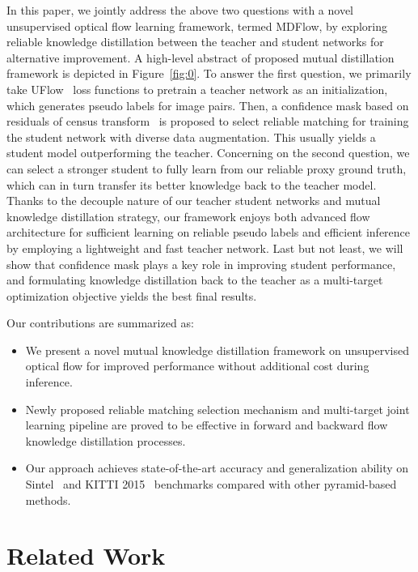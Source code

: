 \documentclass[lettersize,journal]{IEEEtran}
\begin{document}
In this paper, we jointly address the above two questions with a novel unsupervised optical flow learning framework, termed MDFlow, by exploring reliable knowledge distillation between the teacher and student networks for alternative improvement. A high-level abstract of proposed mutual distillation framework is depicted in Figure~\ref{fig:0}. To answer the first question, we primarily take UFlow~\cite{10.1007/978-3-030-58536-5_33} loss functions to pretrain a teacher network as an initialization, which generates pseudo labels for image pairs. Then, a confidence mask based on residuals of census transform~\cite{10.1007/BFb0028345} is proposed to select reliable matching for training the student network with diverse data augmentation. This usually yields a student model outperforming the teacher. Concerning on the second question, we can select a stronger student to fully learn from our reliable proxy ground truth, which can in turn transfer its better knowledge back to the teacher model. Thanks to the decouple nature of our teacher student networks and mutual knowledge distillation strategy, our framework enjoys both advanced flow architecture for sufficient learning on reliable pseudo labels and efficient inference by employing a lightweight and fast teacher network. Last but not least, we will show that confidence mask plays a key role in improving student performance, and formulating knowledge distillation back to the teacher as a multi-target optimization objective yields the best final results.

Our contributions are summarized as: 
\begin{itemize}
	\item
	We present a novel mutual knowledge distillation framework on unsupervised optical flow for improved performance without additional cost during inference.
	\item
	Newly proposed reliable matching selection mechanism and multi-target joint learning pipeline are proved to be effective in forward and backward flow knowledge distillation processes.
	\item
	Our approach achieves state-of-the-art accuracy and generalization ability on Sintel~\cite{Butler:ECCV:2012} and KITTI 2015~\cite{Menze2015CVPR} benchmarks compared with other pyramid-based methods.
\end{itemize}


\section{Related Work}
\end{document}

